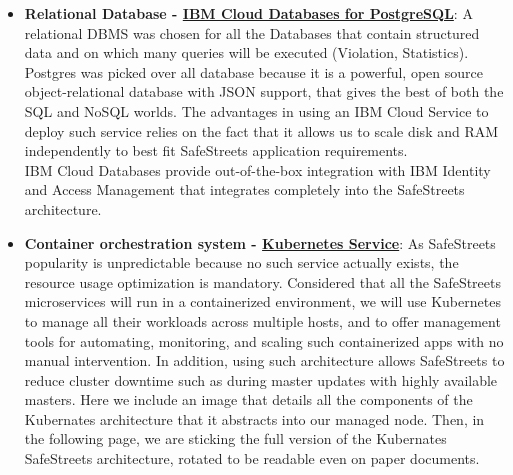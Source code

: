 \begin{itemize}
	\item \textbf{Relational Database - \href{https://cloud.ibm.com/catalog/services/databases-for-postgresql}{IBM Cloud Databases for PostgreSQL}}: \hypertarget{postgres}{} A relational DBMS was chosen for all the Databases that contain structured data and on which many queries will be executed (Violation, Statistics). Postgres was picked over all database because it is a powerful, open source object-relational database with JSON support, that gives the best of both the SQL and NoSQL worlds. The advantages in using an IBM Cloud Service to deploy such service relies on the fact that it allows us to scale disk and RAM independently to best fit SafeStreets application requirements.
	\\IBM Cloud Databases provide out-of-the-box integration with IBM Identity and Access Management that integrates completely into the SafeStreets architecture. 
	\clearpage
	\item \textbf{Container orchestration system - \href{https://cloud.ibm.com/kubernetes/catalog/cluster}{Kubernetes Service}}: \hypertarget{kubernetes}{} As SafeStreets popularity is unpredictable because no such service actually exists, the resource usage optimization is mandatory. Considered that all the SafeStreets microservices will run in a containerized environment, we will use Kubernetes to manage all their workloads across multiple hosts, and to offer management tools for automating, monitoring, and scaling such containerized apps with no manual intervention. In addition, using such architecture allows SafeStreets to reduce cluster downtime such as during master updates with highly available masters.
	Here we include an image that details all the components of the Kubernates architecture that it abstracts into our managed node. 
	Then, in the following page, we are sticking the full version of the Kubernates SafeStreets architecture, rotated to be readable even on paper documents.
	\clearpage
	
\end{itemize}